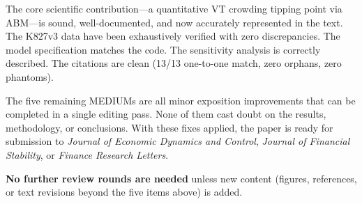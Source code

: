 \documentclass[12pt,a4paper]{article}
\begin{document}
\noindent The core scientific contribution---a quantitative VT crowding tipping point via ABM---is sound, well-documented, and now accurately represented in the text. The K827v3 data have been exhaustively verified with zero discrepancies. The model specification matches the code. The sensitivity analysis is correctly described. The citations are clean (13/13 one-to-one match, zero orphans, zero phantoms).

\medskip

\noindent The five remaining MEDIUMs are all minor exposition improvements that can be completed in a single editing pass. None of them cast doubt on the results, methodology, or conclusions. With these fixes applied, the paper is ready for submission to \emph{Journal of Economic Dynamics and Control}, \emph{Journal of Financial Stability}, or \emph{Finance Research Letters}.

\medskip

\noindent\textbf{No further review rounds are needed} unless new content (figures, references, or text revisions beyond the five items above) is added.
\end{document}
